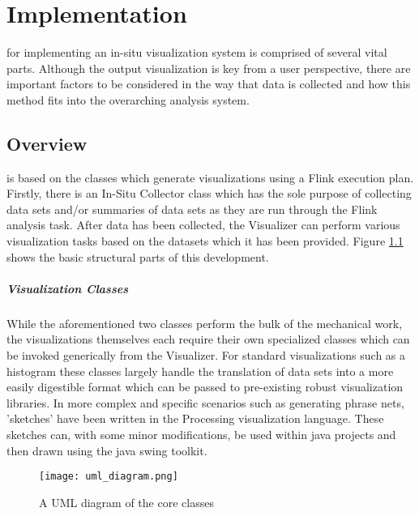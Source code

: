 \chapter{Implementation}
\label{sec:implementation}
 for implementing an in-situ visualization system is comprised of several vital parts. Although the  output visualization is key from a user perspective, there are important factors to be considered in the way that data is collected and how this method fits into the overarching analysis system. 
 
\section{Overview}
\label{sec:overview}
 is based on the classes which generate visualizations using a Flink execution plan. Firstly, there is an In-Situ Collector class which has the sole purpose of collecting data sets and/or summaries of data sets as they are run through the Flink analysis task. After data has been collected, the Visualizer can perform various visualization tasks based on the datasets which it has been provided. Figure \ref{fig:uml} shows the basic structural parts of this development. 

\paragraph{Visualization Classes}
While the aforementioned two classes perform the  bulk of the mechanical work, the visualizations themselves each require their own specialized classes which can be invoked generically from the Visualizer. For standard visualizations such as a histogram these classes largely handle the translation of data sets into a more easily digestible format which can be passed to pre-existing robust visualization libraries. In more complex and specific scenarios such as generating phrase nets, 'sketches' have been written in the Processing visualization language. These sketches can, with some minor modifications, be used within java projects and then drawn using the java swing toolkit. 

\begin{figure}
	\centering
	\label{fig:uml}
	\texttt{[image: uml\_diagram.png]}
	\caption{A UML diagram of the core classes}
\end{figure}

